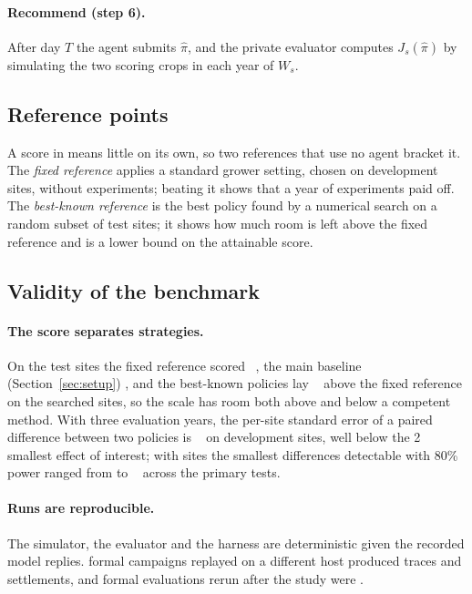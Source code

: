 \paragraph{Recommend (step 6).} After day $T$ the agent submits $\hat\pi$, and the private evaluator computes $J_s(\hat\pi)$ by simulating the two scoring crops in each year of $W_s$.

\subsection{Reference points}
\label{sec:refs}
A score in \eur{} means little on its own, so two references that use no agent bracket it. The \emph{fixed reference} applies a standard grower setting, chosen on development sites, without experiments; beating it shows that a year of experiments paid off. The \emph{best-known reference} is the best policy found by a numerical search on a random subset of test sites; it shows how much room is left above the fixed reference and is a lower bound on the attainable score.

\subsection{Validity of the benchmark}
\label{sec:validity}
\paragraph{The score separates strategies.} On the test sites the fixed reference scored ~\eur{}, the main baseline (Section~\ref{sec:setup}) , and the best-known policies lay ~\eur{} above the fixed reference on the searched sites, so the scale has room both above and below a competent method. With three evaluation years, the per-site standard error of a paired difference between two policies is ~\eur{} on development sites, well below the 2~\eur{} smallest effect of interest; with  sites the smallest differences detectable with 80\% power ranged from  to ~\eur{} across the primary tests.
\paragraph{Runs are reproducible.} The simulator, the evaluator and the harness are deterministic given the recorded model replies.  formal campaigns replayed on a different host produced  traces and settlements, and  formal evaluations rerun after the study were .
